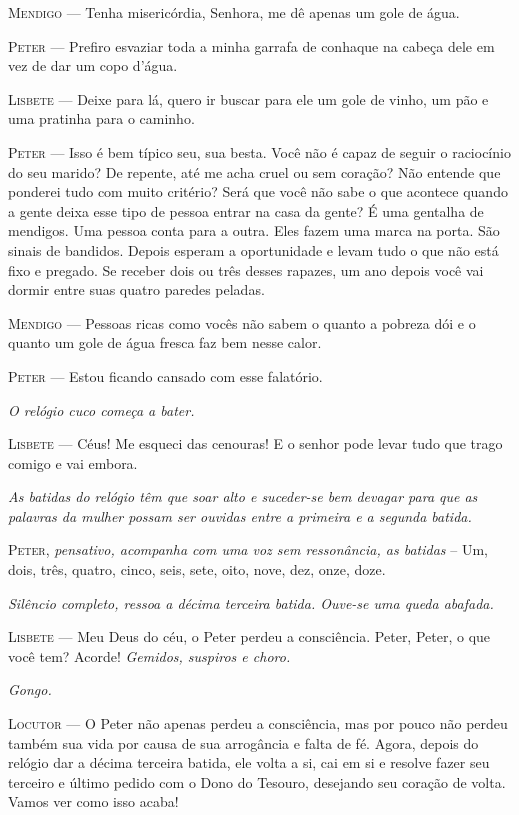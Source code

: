 \textsc{Mendigo} --- Tenha misericórdia, Senhora, me dê apenas um gole de água.

\textsc{Peter} --- Prefiro esvaziar toda a minha garrafa de conhaque na cabeça
dele em vez de dar um copo d'água.

\textsc{Lisbete} --- Deixe para lá, quero ir buscar para ele um gole de vinho, um
pão e uma pratinha para o caminho.

\textsc{Peter} --- Isso é bem típico seu, sua besta. Você não é capaz de seguir o
raciocínio do seu marido? De repente, até me acha cruel ou sem coração?
Não entende que ponderei tudo com muito critério? Será que você não sabe
o que acontece quando a gente deixa esse tipo de pessoa entrar na casa
da gente? É uma gentalha de mendigos. Uma pessoa conta para a outra.
Eles fazem uma marca na porta. São sinais de bandidos. Depois esperam a
oportunidade e levam tudo o que não está fixo e pregado. Se receber dois
ou três desses rapazes, um ano depois você vai dormir entre suas quatro
paredes peladas.

\textsc{Mendigo} --- Pessoas ricas como vocês não sabem o quanto a pobreza dói e o
quanto um gole de água fresca faz bem nesse calor.

\textsc{Peter} --- Estou ficando cansado com esse falatório.

\emph{O relógio cuco começa a bater.}

\textsc{Lisbete} --- Céus! Me esqueci das cenouras! E o senhor pode levar tudo que
trago comigo e vai embora.

\emph{As batidas do relógio têm que soar alto e suceder-se bem devagar
para que as palavras da mulher possam ser ouvidas entre a primeira e a
segunda batida.}

\textsc{Peter}, \emph{pensativo, acompanha com uma voz sem ressonância, as
batidas} -- Um, dois, três, quatro, cinco, seis, sete, oito, nove, dez,
onze, doze.

\emph{Silêncio completo, ressoa a décima terceira batida. Ouve-se uma
queda abafada.}

\textsc{Lisbete} --- Meu Deus do céu, o Peter perdeu a consciência. Peter, Peter,
o que você tem? Acorde! \emph{Gemidos, suspiros e choro.}

\emph{Gongo.}

\textsc{Locutor} --- O Peter não apenas perdeu a consciência, mas por pouco não
perdeu também sua vida por causa de sua arrogância e falta de fé. Agora,
depois do relógio dar a décima terceira batida, ele volta a si, cai em
si e resolve fazer seu terceiro e último pedido com o Dono do Tesouro,
desejando seu coração de volta. Vamos ver como isso acaba!

